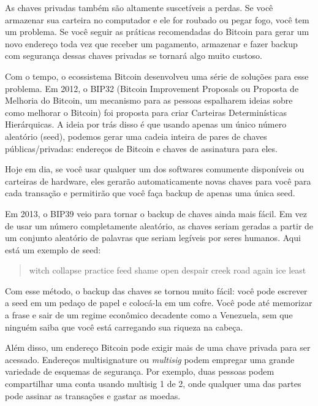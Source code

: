 As chaves privadas também são altamente suscetíveis a perdas. Se você armazenar sua carteira no computador e ele for roubado ou pegar fogo, você tem um problema. Se você seguir as práticas recomendadas do Bitcoin para gerar um novo endereço toda vez que receber um pagamento, armazenar e fazer backup com segurança dessas chaves privadas se tornará algo muito custoso.

Com o tempo, o ecossistema Bitcoin desenvolveu uma série de soluções para esse problema. Em 2012, o BIP32 (Bitcoin Improvement Proposals ou Proposta de Melhoria do Bitcoin, um mecanismo para as pessoas espalharem ideias sobre como melhorar o Bitcoin) foi proposta para criar Carteiras Determinísticas Hierárquicas. A ideia por trás disso é que usando apenas um único número aleatório (seed), podemos gerar uma cadeia inteira de pares de chaves públicas/privadas: endereços de Bitcoin e chaves de assinatura para eles.

Hoje em dia, se você usar qualquer um dos softwares comumente disponíveis ou carteiras de hardware, eles gerarão automaticamente novas chaves para você para cada transação e permitirão que você faça backup de apenas uma única seed.

Em 2013, o BIP39 veio para tornar o backup de chaves ainda mais fácil. Em vez de usar um número completamente aleatório, as chaves seriam geradas a partir de um conjunto aleatório de palavras que seriam legíveis por seres humanos. Aqui está um exemplo de seed:

\begin{samepage}
\begin{quote}{witch collapse practice feed shame open despair creek road again ice least}\end{quote}
\end{samepage}

Com esse método, o backup das chaves se tornou muito fácil: você pode escrever a seed em um pedaço de papel e colocá-la em um cofre. Você pode até memorizar a frase e sair de um regime econômico decadente como a Venezuela, sem que ninguém saiba que você está carregando sua riqueza na cabeça.

Além disso, um endereço Bitcoin pode exigir mais de uma chave privada para ser acessado. Endereços multisignature ou \textit{multisig} podem empregar uma grande variedade de esquemas de segurança. Por exemplo, duas pessoas podem compartilhar uma conta usando multisig 1 de 2, onde qualquer uma das partes pode assinar as transações e gastar as moedas.

